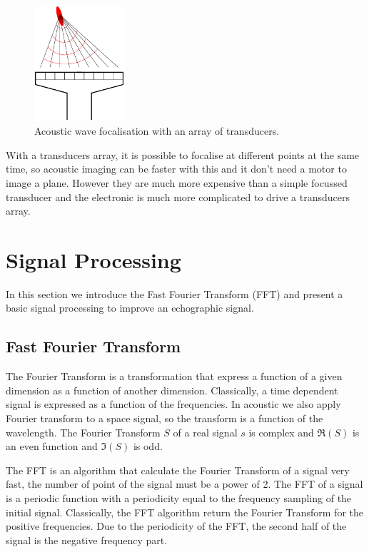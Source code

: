 \documentclass[a4paper,twoside,11pt]{article}
\begin{document}
\begin{figure}[htb]
	\centering
		\includegraphics[width=0.3\textwidth]{image/transducers_array}
	\caption{Acoustic wave focalisation with an array of transducers.}
	\label{fig:transducers array}
\end{figure}

With a transducers array, it is possible to focalise at different points at the 
same time, so acoustic imaging can be faster with this and it don't need a motor to 
image a plane. However they are much more expensive than a simple focussed 
transducer and the electronic is much more complicated to drive a transducers 
array. 

\clearpage
\section{Signal Processing}
\label{sec:Signal Processing}

In this section we introduce the Fast Fourier Transform (FFT) and present a 
basic signal processing to improve an echographic signal.

\subsection{Fast Fourier Transform}
\label{sec:Fast Fourier Transform}
\FloatBarrier

The Fourier Transform is a transformation that express a function of a given 
dimension as a function of another dimension. Classically, a time dependent 
signal is expressed as a function of the frequencies. In acoustic we also apply 
Fourier transform to a space signal, so the transform is a function of the 
wavelength. The Fourier Transform $S$ of a real signal $s$ is complex and 
$\Re\left(S\right)$ is an even function and $\Im\left(S\right)$ is odd.

The FFT is an algorithm that calculate the Fourier Transform of a signal very 
fast, the number of point of the signal must be a power of 2. The FFT of a signal 
is a periodic function with a periodicity equal to the frequency sampling of the 
initial signal. Classically, the FFT algorithm return the Fourier Transform for 
the positive frequencies. Due to the periodicity of the FFT, the second half of 
the signal is the negative frequency part.
\end{document}
